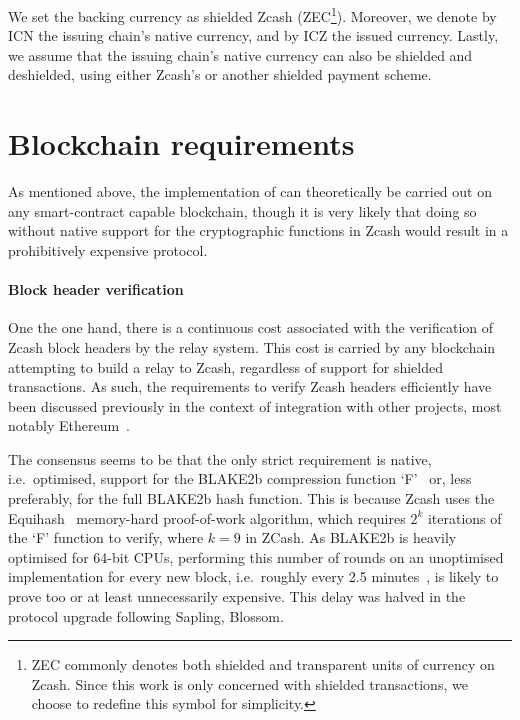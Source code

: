 We set the backing currency as shielded Zcash (ZEC\footnote{ZEC commonly denotes both shielded and transparent units of currency on Zcash. Since this work is only concerned with shielded transactions, we choose to redefine this symbol for simplicity.}).
Moreover, we denote by ICN the issuing chain's native currency, and by ICZ the issued currency.
Lastly, we assume that the issuing chain's native currency can also be shielded and deshielded, using either Zcash's or another shielded payment scheme.


\section{Blockchain requirements}
\label{sec:blockchains}

As mentioned above, the implementation of \zclaim can theoretically be carried out on any smart-contract capable blockchain, though it is very likely that doing so without native support for the cryptographic functions in Zcash would result in a prohibitively expensive protocol.

\paragraph{Block header verification}

One the one hand, there is a continuous cost associated with the verification of Zcash block headers by the relay system.
This cost is carried by any blockchain attempting to build a relay to Zcash, regardless of support for shielded transactions.
As such, the requirements to verify Zcash headers efficiently have been discussed previously in the context of integration with other projects, most notably Ethereum~\cite{WrappedZECGeneralZcashCommunityForum,BLAKE2bFeip152,ProjectAlchemyEthereumZcashIntegrationeffort}.

The consensus seems to be that the only strict requirement is native, i.e.\ optimised, support for the BLAKE2b compression function `F'~\cite[Section 3.2]{rfc7693blake2} or, less preferably, for the full BLAKE2b hash function.
This is because Zcash uses the Equihash~\cite{biryukov2017equihash} memory-hard proof-of-work algorithm, which requires $2^k$ iterations of the `F' function to verify, where $k = 9$ in ZCash.
As BLAKE2b is heavily optimised for 64-bit CPUs, performing this number of rounds on an unoptimised implementation for every new block, i.e.\ roughly every 2.5 minutes~\cite{hopwood2016zcash}, is likely to prove too or at least unnecessarily expensive.
This delay was halved in the protocol upgrade following Sapling, Blossom.

